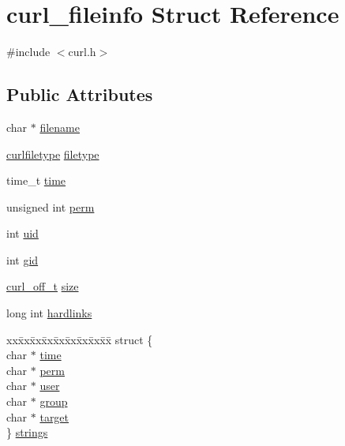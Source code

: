 \hypertarget{structcurl__fileinfo}{}\section{curl\+\_\+fileinfo Struct Reference}
\label{structcurl__fileinfo}


{\ttfamily \#include $<$curl.\+h$>$}

\subsection*{Public Attributes}
\begin{DoxyCompactItemize}
\item 
char $\ast$ \hyperlink{structcurl__fileinfo_ae42985a10c5ac94b2ac09c5e75c05e40}{filename}
\item 
\hyperlink{curl_8h_a9780ca29d2faed151148e197d1d1e94f}{curlfiletype} \hyperlink{structcurl__fileinfo_a69b09df292a2f8a749ffd24f172b0bde}{filetype}
\item 
time\+\_\+t \hyperlink{structcurl__fileinfo_a5136db1360519440e97f481a9a05da0f}{time}
\item 
unsigned int \hyperlink{structcurl__fileinfo_a48e688d2b2feee03da8ae21924f3b97b}{perm}
\item 
int \hyperlink{structcurl__fileinfo_aa6fed17f82b0137397ebcb7b35c4c100}{uid}
\item 
int \hyperlink{structcurl__fileinfo_ab4833a1bcdb0c29421f7c53c30c3fc1e}{gid}
\item 
\hyperlink{curlbuild_8h_a494e2b4279dc064f7ed1d0abd602b28d}{curl\+\_\+off\+\_\+t} \hyperlink{structcurl__fileinfo_a23e38e1ca497cb7a140d9aff92f33fc0}{size}
\item 
long int \hyperlink{structcurl__fileinfo_ab77d9241666cf7c216b8d12e4b55efef}{hardlinks}
\item 
\begin{tabbing}
xx\=xx\=xx\=xx\=xx\=xx\=xx\=xx\=xx\=\kill
struct \{\\
\>char $\ast$ \hyperlink{structcurl__fileinfo_ab25d86f3b4f3c89fb924c6af136b350c}{time}\\
\>char $\ast$ \hyperlink{structcurl__fileinfo_a356964c606c7a4167cc468bffb2dcec9}{perm}\\
\>char $\ast$ \hyperlink{structcurl__fileinfo_af65d2a4ca6d383fcba5db89f2bf124e3}{user}\\
\>char $\ast$ \hyperlink{structcurl__fileinfo_a901b33485167a493e8401da47cad3bb7}{group}\\
\>char $\ast$ \hyperlink{structcurl__fileinfo_a68e8fc68544920dc452306a79bea8907}{target}\\
\} \hyperlink{structcurl__fileinfo_a45518549e5fced720c41dde3fba925ee}{strings}\\


\end{tabbing}
\end{DoxyCompactItemize}

